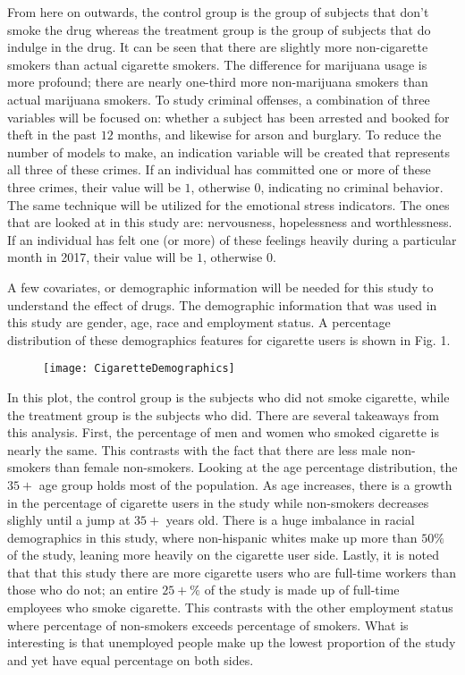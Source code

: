 \documentclass[a4paper, 10pt, conference]{ieeeconf}
\begin{document}


\parindent 10pt From here on outwards, the control group is the group of subjects that don't smoke the drug whereas the treatment group is the group of subjects that do indulge in the drug. It can be seen that there are slightly more non-cigarette smokers than actual cigarette smokers. The difference for marijuana usage is more profound; there are nearly one-third more non-marijuana smokers than actual marijuana smokers. To study criminal offenses, a combination of three variables will be focused on: whether a subject has been arrested and booked for theft in the past $12$ months, and likewise for arson and burglary. To reduce the number of models to make, an indication variable will be created that represents all three of these crimes. If an individual has committed one or more of these three crimes, their value will be $1$, otherwise $0$, indicating no criminal behavior. The same technique will be utilized for the emotional stress indicators. The ones that are looked at in this study are: nervousness, hopelessness and worthlessness. If an individual has felt one (or more) of these feelings heavily during a particular month in 2017, their value will be $1$, otherwise $0$. 

A few covariates, or demographic information will be needed for this study to understand the effect of drugs. The demographic information that was used in this study are gender, age, race and employment status. A percentage distribution of these demographics features for cigarette users is shown in Fig. 1. 
\begin{figure} \texttt{[image: CigaretteDemographics]}  \end{figure} 
\parindent 10pt In this plot, the control group is the subjects who did not smoke cigarette, while the treatment group is the subjects who did. There are several takeaways from this analysis. 
First, the percentage of men and women who smoked cigarette is nearly the same. This contrasts with the fact that there are less male non-smokers than female non-smokers. Looking at the age percentage distribution, the $35+$ age group holds most of the population. As age increases, there is a growth in the percentage of cigarette users in the study while non-smokers decreases slighly until a jump at $35+$ years old. There is a huge imbalance in racial demographics in this study, where non-hispanic whites make up more than $50\%$ of the study, leaning more heavily on the cigarette user side. Lastly, it is noted that that this study there are more cigarette users who are full-time workers than those who do not; an entire $25+\%$ of the study is made up of full-time employees who smoke cigarette. This contrasts with the other employment status where percentage of non-smokers exceeds percentage of smokers. What is interesting is that unemployed people make up the lowest proportion of the study and yet have equal percentage on both sides. 
\end{document}

